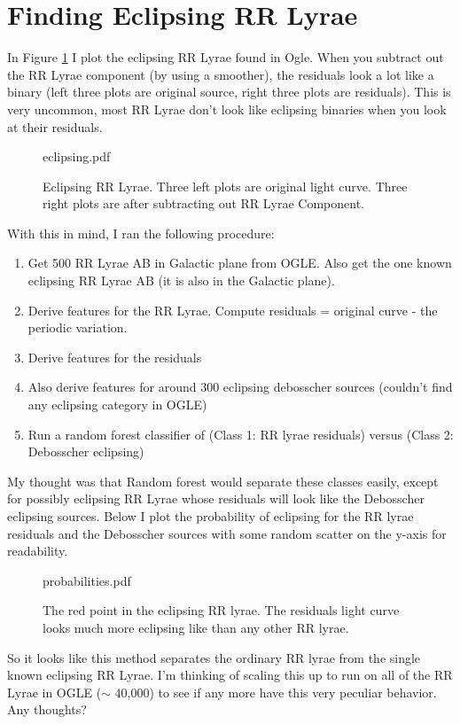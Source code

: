 \documentclass[10pt]{article}
\title{}
\date{}
\author{}
\begin{document}
\section*{Finding Eclipsing RR Lyrae}

In Figure \ref{eclipsing} I plot the eclipsing RR Lyrae found in Ogle. When you subtract out the RR Lyrae component (by using a smoother), the residuals look a lot like a binary (left three plots are original source, right three plots are residuals). This is very uncommon, most RR Lyrae don't look like eclipsing binaries when you look at their residuals.

\begin{figure}[h]
  \begin{center}
    \begin{includegraphics}[height=4in,width=6in]{eclipsing.pdf}
      \caption{Eclipsing RR Lyrae. Three left plots are original light curve. Three right plots are after subtracting out RR Lyrae Component.\label{eclipsing}}
    \end{includegraphics}
  \end{center}
\end{figure}



With this in mind, I ran the following procedure:

\begin{enumerate}
\item Get 500 RR Lyrae AB in Galactic plane from OGLE. Also get the one known eclipsing RR Lyrae AB (it is also in the Galactic plane).
\item Derive features for the RR Lyrae. Compute residuals = original curve - the periodic variation.
\item Derive features for the residuals
\item Also derive features for around 300 eclipsing debosscher sources (couldn't find any eclipsing category in OGLE)
\item Run a random forest classifier of (Class 1: RR lyrae residuals) versus (Class 2: Debosscher eclipsing)
\end{enumerate}

My thought was that Random forest would separate these classes easily, except for possibly eclipsing RR Lyrae whose residuals will look like the Debosscher eclipsing sources. Below I plot the probability of eclipsing for the RR lyrae residuals and the Debosscher sources with some random scatter on the y-axis for readability.


\begin{figure}[h]
  \begin{center}
    \begin{includegraphics}[height=4in,width=6in]{probabilities.pdf}
      \caption{The red point in the eclipsing RR lyrae. The residuals light curve looks much more eclipsing like than any other RR lyrae.\label{probabilities}}
    \end{includegraphics}
  \end{center}
\end{figure}



So it looks like this method separates the ordinary RR lyrae from the single known eclipsing RR Lyrae. I'm thinking of scaling this up to run on all of the RR Lyrae in OGLE ($\sim$ 40,000) to see if any more have this very peculiar behavior. Any thoughts?
\end{document}
